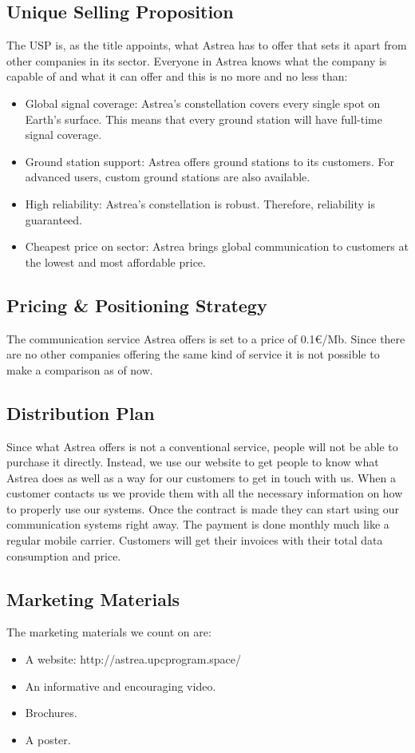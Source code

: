 \subsection{Unique Selling Proposition}
The USP is, as the title appoints, what Astrea has to offer that sets it apart from other companies in its sector. Everyone in Astrea knows what the company is capable of and what it can offer and this is no more and no less than:
\begin{itemize}
\item Global signal coverage: Astrea's constellation covers every single spot on Earth's surface. This means that every ground station will have full-time signal coverage.
\item Ground station support: Astrea offers ground stations to its customers. For advanced users, custom ground stations are also available.
\item High reliability: Astrea's constellation is robust. Therefore, reliability is guaranteed.
\item Cheapest price on sector: Astrea brings global communication to customers at the lowest and most affordable price.
\end{itemize}
\subsection{Pricing \& Positioning Strategy}
The communication service Astrea offers is set to a price of 0.1\euro /Mb. Since there are no other companies offering the same kind of service it is not possible to make a comparison as of now. 

\subsection{Distribution Plan}
Since what Astrea offers is not a conventional service, people will not be able to purchase it directly. Instead, we use our website to get people to know what Astrea does as well as a way for our customers to get in touch with us. When a customer contacts us we provide them with all the necessary information on how to properly use our systems. Once the contract is made they can start using our communication systems right away. The payment is done monthly much like a regular mobile carrier. Customers will get their invoices with their total data consumption and price.

\subsection{Marketing Materials}
The marketing materials we count on are:
\begin{itemize}
\item A website: http://astrea.upcprogram.space/
\item An informative and encouraging video.
\item Brochures.
\item A poster.
\end{itemize}

